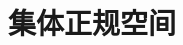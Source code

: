 \documentclass[main.tex]{subfiles}
\begin{document}
	
\section{集体正规空间}\label{ch3.2}

	
\end{document}
